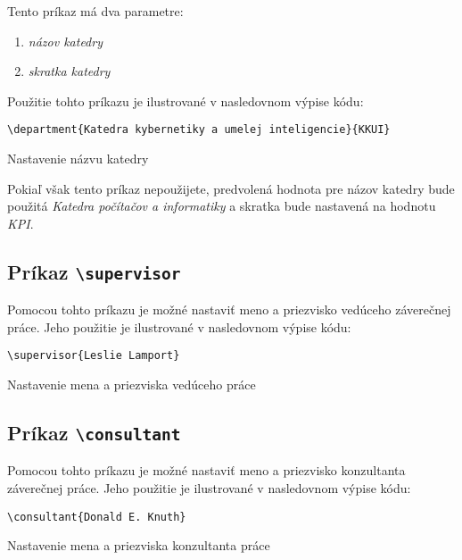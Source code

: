 Tento príkaz má dva parametre:

\begin{enumerate}
    \item {\it názov katedry} 
    \item {\it skratka katedry}
\end{enumerate}

Použitie tohto príkazu je ilustrované v nasledovnom výpise kódu:

\begin{listing}[ht]
\begin{verbatim}
\department{Katedra kybernetiky a umelej inteligencie}{KKUI}
\end{verbatim}
\caption{Nastavenie názvu katedry}
\end{listing}

Pokiaľ však tento príkaz nepoužijete, predvolená hodnota pre názov katedry bude použitá {\it Katedra počítačov a informatiky} a skratka bude nastavená na hodnotu {\it KPI}.


\subsection{Príkaz {\tt \textbackslash{}supervisor}}

Pomocou tohto príkazu je možné nastaviť meno a priezvisko vedúceho záverečnej práce. Jeho použitie je ilustrované v nasledovnom výpise kódu:

\begin{listing}[ht]
\begin{verbatim}
\supervisor{Leslie Lamport}
\end{verbatim}
\caption{Nastavenie mena a priezviska vedúceho práce}
\end{listing}


\subsection{Príkaz {\tt \textbackslash{}consultant}}

Pomocou tohto príkazu je možné nastaviť meno a priezvisko konzultanta záverečnej práce. Jeho použitie je ilustrované v nasledovnom výpise kódu:

\begin{listing}[ht]
\begin{verbatim}
\consultant{Donald E. Knuth}
\end{verbatim}
\caption{Nastavenie mena a priezviska konzultanta práce}
\end{listing}


